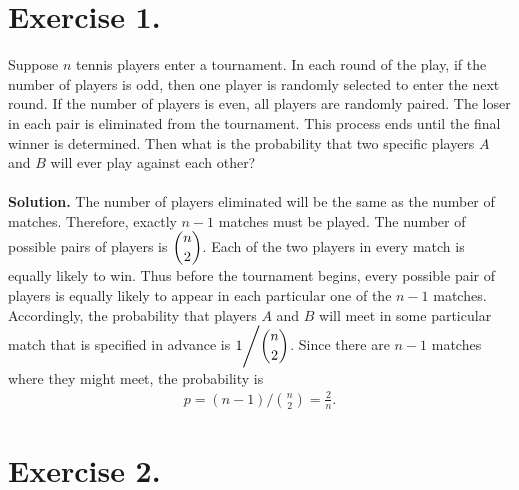 \section*{Exercise 1.}

Suppose $n$ tennis players enter a tournament. In each round of the play, if the number of players is odd, then one player is randomly selected to enter the next round. If the number of players is even, all players are randomly paired. The loser in each pair is eliminated from the tournament. This process ends until the final winner is determined. Then what is the probability that two specific players $A$ and $B$ will ever play against each other? 
~\\
~\\
\textbf{Solution.} The number of players eliminated will be the same as the number of matches. Therefore, exactly $n-1$ matches must be played. The number of possible pairs of players is $\dbinom{n}{2}$. Each of the two players in every match is equally likely to win. Thus before the tournament begins, every possible pair of players is equally likely to appear in each particular one of the $n-1$ matches. Accordingly, the probability that players $A$ and $B$ will meet in some particular match that is specified in advance is $1\Bigg/\dbinom{n}{2}$. Since there are $n-1$ matches where they might meet, the probability is
\begin{align*}
p = (n-1)\Bigg/\binom{n}{2} = \frac{2}{n}.
\end{align*}

\section*{Exercise 2.}


